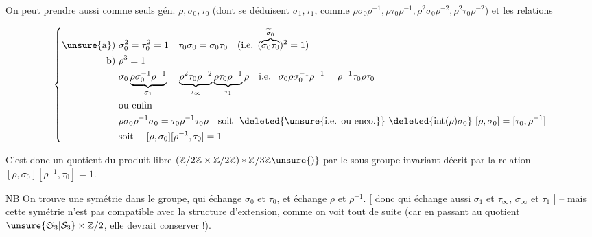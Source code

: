 

On peut prendre aussi comme seuls gén. $\rho,\sigma_0,\tau_0$ (dont se déduisent $\sigma_1,\tau_1$,  comme $\rho\sigma_0\rho^{-1},\rho\tau_0\rho^{-1},\rho^2\sigma_0\rho^{-2},\rho^2\tau_0\rho^{-2}$) et les relations

\[
\left\{\begin{aligned}
\text{\unsure{a}) }&\sigma_0^2=\tau_0^2=1\quad \tau_0\sigma_0=\sigma_0\tau_0\quad
\text{(i.e. }(\overbrace{\sigma_0\tau_0}^{\widetilde\sigma_0})^2=1\text{)}\\
\text{b) }&\rho^3=1\\
&\sigma_0\underbrace{\rho\sigma_0^{-1}\rho^{-1}}_{\sigma_1}
=\underbrace{\rho^2\tau_0\rho^{-2}}_{\tau_\infty}\underbrace{\rho\tau_0\rho^{-1}}_{\tau_1}\rho\quad
\text{i.e. }\ \sigma_0\rho\sigma_0^{-1}\rho^{-1}=\rho^{-1}\tau_0\rho\tau_0\\
&\text{ou enfin}\\
&\rho\sigma_0\rho^{-1}\sigma_0=\tau_0\rho^{-1}\tau_0\rho\quad
\text{soit }\ \deleted{\text{\unsure{i.e. ou enco.}}}\ \deleted{\mathrm{int}(\rho)\sigma_0}\ 
[\rho,\sigma_0]=[\tau_0,\rho^{-1}]\\
&\text{soit }\quad [\rho,\sigma_0][\rho^{-1},\tau_0]=1
\end{aligned}\right.
\]

C'est donc un quotient du produit libre $(\mathbb Z/2\mathbb Z\times\mathbb Z/2\mathbb Z)*\mathbb Z/3\mathbb Z\unsure{)}$ par le sous-groupe invariant décrit par la relation $[\rho,\sigma_0][\rho^{-1},\tau_0]=1$.

\uline{NB} On trouve une symétrie dans le groupe, qui échange $\sigma_0$ et $\tau_0$, et échange $\rho$ et $\rho^{-1}$. [ donc qui échange aussi $\sigma_1$ et $\tau_\infty$, $\sigma_\infty$ et $\tau_1$ ] -- mais cette symétrie n'est pas compatible avec la structure d'extension, comme on voit tout  de suite (car en passant au quotient $\unsure{\mathfrak S_3|\mathcal S_3}\times\mathbb Z/2$, elle devrait conserver  !).

